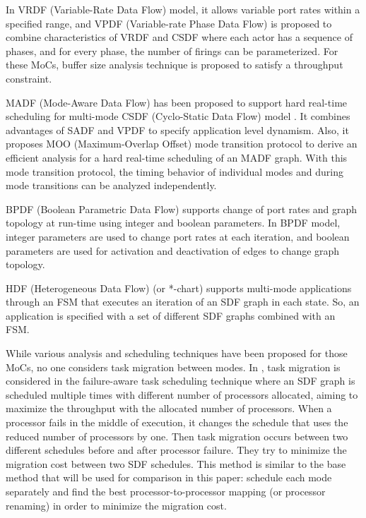 \documentclass[prodmode,acmtecs]{acmsmall}
\begin{document}
In VRDF (Variable-Rate Data Flow) \cite{Wiggers:2008} model, it allows variable port rates within a specified range, and VPDF (Variable-rate Phase Data Flow) \cite{Wiggers:2008} is proposed to combine characteristics of VRDF and CSDF where each actor has a sequence of phases, and for every phase, the number of firings can be parameterized. For these MoCs, buffer size analysis technique is proposed to satisfy a throughput constraint.

MADF (Mode-Aware Data Flow) \cite{Zhai:2015} has been proposed to support hard real-time scheduling for multi-mode CSDF (Cyclo-Static Data Flow) model \cite{Bilsen:1995}. It combines advantages of SADF and VPDF to specify application level dynamism. Also, it proposes MOO (Maximum-Overlap Offset) mode transition protocol to derive an efficient analysis for a hard real-time scheduling of an MADF graph. With this mode transition protocol, the timing behavior of individual modes and during mode transitions can be analyzed independently.

BPDF (Boolean Parametric Data Flow) \cite{Bebelis:2013} supports change of port rates and graph topology at run-time using integer and boolean parameters. In BPDF model, integer parameters are used to change port rates at each iteration, and boolean parameters are used for activation and deactivation of edges to change graph topology.

HDF (Heterogeneous Data Flow) (or *-chart) \cite{Girault:1999} supports multi-mode applications through an FSM that executes an iteration of an SDF graph in each state. So, an application is specified with a set of different SDF graphs combined with an FSM.

While various analysis and scheduling techniques have been proposed for those MoCs, no one considers task migration between modes. In \cite{Lee:2013}, task migration is considered in the failure-aware task scheduling technique where an SDF graph is scheduled multiple times with different number of processors allocated, aiming to maximize the throughput with the allocated number of processors. When a processor fails in the middle of execution, it changes the schedule that uses the reduced number of processors by one. Then task migration occurs between two different schedules before and after processor failure. They try to minimize the migration cost between two SDF schedules. This method is similar to the base method that will be used for comparison in this paper: schedule each mode separately and find the best processor-to-processor mapping (or processor renaming) in order to minimize the migration cost.
\end{document}
